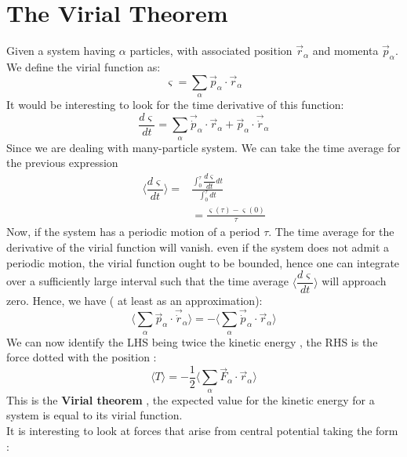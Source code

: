 \chapter{The Virial Theorem}

Given a system having $ \alpha$ particles, with associated position $\vec{r}_\alpha$ and momenta $\vec{p}_\alpha$. We define the virial function as:
\begin{equation}
\varsigma = \sum_{\alpha} \vec{p}_\alpha \cdot \vec{r}_\alpha
\end{equation}
      It would be interesting to look for the time derivative of this function:
      \begin{equation}
     \dfrac{d \varsigma }{dt} = \sum_{\alpha} \vec{\dot{p}}_\alpha \cdot \vec{r}_\alpha + \vec{p}_\alpha \cdot \vec{\dot{r}}_\alpha
      \end{equation}
    Since we are dealing with many-particle system. We can take the time average for the previous expression 
      \begin{align}
     \langle \dfrac{d \varsigma }{dt} \rangle  =& \frac{\int _0 ^\tau \dfrac{d \varsigma }{dt} dt}{\int _0 ^\tau   dt }\\ \nonumber 
     &= \frac{ \varsigma(\tau)- \varsigma(0)}{\tau}
  \end{align}
  Now, if the system has a periodic motion of a period $ \tau$. The time average for the derivative of the virial function will vanish. even if the system does not admit a periodic motion, the virial function ought to be bounded, hence one can integrate over a sufficiently large interval such that the time average $ \langle \dfrac{d \varsigma }{dt} \rangle $ will approach zero. Hence, we have ( at least as an approximation): 
  \begin{equation}
 \langle \sum_{\alpha}  \vec{p}_\alpha \cdot \vec{\dot{r}}_\alpha\rangle = -  \langle \sum_{\alpha} \vec{\dot{p}}_\alpha \cdot \vec{r}_\alpha \rangle
  \end{equation}
  We can now identify the LHS being twice the kinetic energy , the RHS is the force dotted with the position :
   \begin{equation}
  \langle T \rangle= - \frac{1}{2} \langle \sum_{\alpha} \vec{F}_\alpha \cdot \vec{r}_\alpha \rangle
  \label{vir}
   \end{equation}
   This is the\textbf{ Virial theorem }, the expected value for the kinetic energy for a system is equal to its virial function.\\
   It is interesting to look at forces that arise from central potential taking the form :
